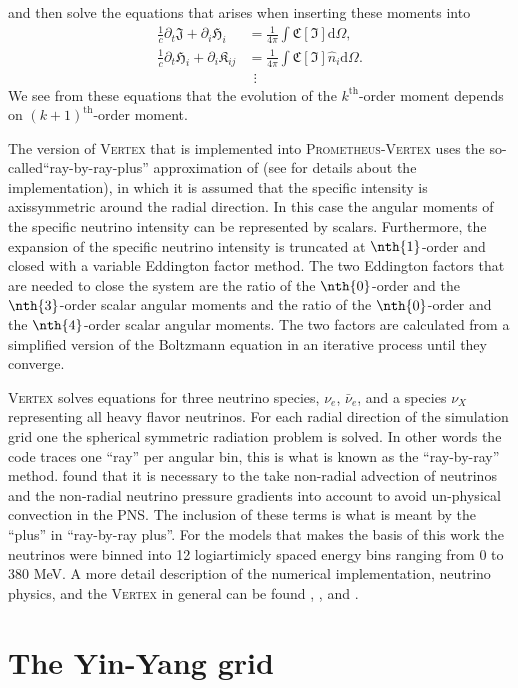 and then solve the equations that arises when inserting these moments into 
\begin{align}
\frac{1}{c} \partial_t \mathfrak{J} +  \partial_i \mathfrak{H}_i &= \frac{1}{4\pi} \int \mathfrak{C} [\mathfrak{I}] \mathrm{d} \Omega, \\
\frac{1}{c} \partial_t \mathfrak{H}_i + \partial_i \mathfrak{K}_{ij} &= \frac{1}{4\pi} \int \mathfrak{C} [\mathfrak{I}] \hat{n}_i \mathrm{d} \Omega. \\
& \ \ \vdots \nonumber
\end{align}
We see from these equations that the evolution of the $k^{\text{th}}$-order moment depends on $(k+1)^{\text{th}}$-order moment.

The version of \textsc{Vertex} that is implemented into \textsc{Prometheus-Vertex} uses
the so-called``ray-by-ray-plus'' approximation of \cite{buras_06a} (see \cite{hanke_phd} for details about the implementation),
in which it is assumed that the specific intensity is axissymmetric around the radial direction. 
In this case the angular moments of the specific neutrino intensity can be represented by scalars.
Furthermore, the expansion of the specific neutrino intensity is truncated at $\nth{1}$-order and
closed with a variable Eddington factor method. The two Eddington factors that are needed to close the system are the ratio of
the $\nth{0}$-order and the $\nth{3}$-order scalar angular moments and the ratio of the $\nth{0}$-order and the $\nth{4}$-order scalar angular moments.
The two factors are calculated from a simplified version of the Boltzmann equation in an iterative 
process until they converge. 

\textsc{Vertex} solves equations for three neutrino species, $\nu_e$, $\bar{\nu}_e$, and a species $\nu_X$ representing
all heavy flavor neutrinos. For each radial direction of the simulation grid one the spherical symmetric radiation problem is solved.
In other words the code traces one ``ray'' per angular bin, this is what is known as the ``ray-by-ray'' method. \cite{buras_06b} 
found that it is necessary to the take non-radial advection of neutrinos and the non-radial neutrino pressure gradients into account to avoid 
un-physical convection in the PNS. The inclusion of these terms is what is meant by the ``plus'' in ``ray-by-ray plus''.
For the models that makes the basis of this work the neutrinos were binned into 12 logiartimicly spaced energy bins ranging from 0 to 380 MeV.  
A more detail description of the numerical implementation, neutrino physics, and the \textsc{Vertex} in general can
be found \cite{rampp_02}, \cite{hanke_phd}, and \cite{melson_phd}.

\section{The Yin-Yang grid}
